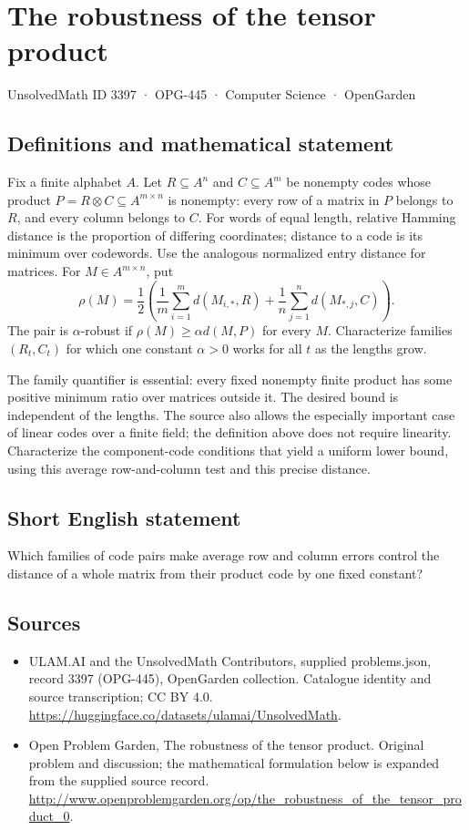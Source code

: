 \documentclass[11pt,a4paper]{article}
\begin{document}
\section*{The robustness of the tensor product}\label{3397}
{\small UnsolvedMath ID 3397 · OPG-445 · Computer Science · OpenGarden}
\subsection{Definitions and mathematical statement}
Fix a finite alphabet $A$. Let $R\subseteq A^n$ and $C\subseteq A^m$
be nonempty codes whose product
$P=R\otimes C\subseteq A^{m\times n}$ is nonempty: every row of
a matrix in $P$ belongs to $R$, and every column belongs to $C$.
For words of equal length, relative Hamming distance is the proportion
of differing coordinates; distance to a code is its minimum over
codewords. Use the analogous normalized entry distance for matrices.
For $M\in A^{m\times n}$, put
\[
 \rho(M)=\frac12\left(\frac1m\sum_{i=1}^m d(M_{i,*},R)
                  +\frac1n\sum_{j=1}^n d(M_{*,j},C)\right).
\]
The pair is $\alpha$-robust if $\rho(M)\ge\alpha d(M,P)$ for every
$M$. Characterize families $(R_t,C_t)$ for which one constant
$\alpha>0$ works for all $t$ as the lengths grow.

The family quantifier is essential: every fixed nonempty finite
product has some positive minimum ratio over matrices outside it.
The desired bound is independent of the lengths. The source also
allows the especially important case of linear codes over a finite
field; the definition above does not require linearity. Characterize
the component-code conditions that yield a uniform lower bound,
using this average row-and-column test and this precise distance.
\subsection{Short English statement}
Which families of code pairs make average row and column errors control the distance of a whole matrix from their product code by one fixed constant?
\subsection{Sources}
\begin{itemize}
\item[S1] ULAM.AI and the UnsolvedMath Contributors, supplied problems.json, record 3397 (OPG-445), OpenGarden collection. Catalogue identity and source transcription; CC BY 4.0.
\url{https://huggingface.co/datasets/ulamai/UnsolvedMath}.
\item[S2] Open Problem Garden, The robustness of the tensor product. Original problem and discussion; the mathematical formulation below is expanded from the supplied source record.
\url{http://www.openproblemgarden.org/op/the_robustness_of_the_tensor_product_0}.
\end{itemize}
\end{document}
